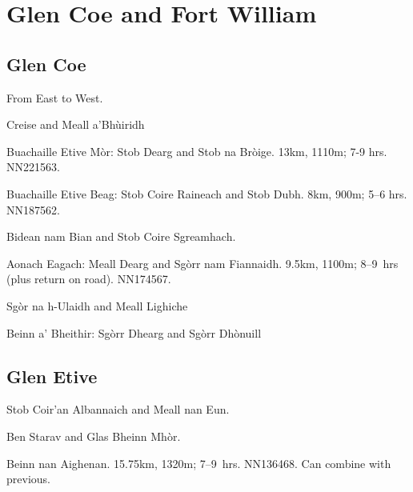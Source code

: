 
\section{Glen Coe and Fort William}

\subsection{Glen Coe}

From East to West. 

\begin{munros}
\item
Creise and Meall a'Bhùiridh

\item
Buachaille Etive Mòr: Stob Dearg and Stob na Bròige.  13km, 1110m; 7-9
hrs.  NN221563. \tick

\item
Buachaille Etive Beag: Stob Coire Raineach and Stob Dubh.  8km, 900m; 5--6
hrs.  NN187562.  \tick

\item
Bidean nam Bian and Stob Coire Sgreamhach.  \tick

\item\target
Aonach Eagach: Meall Dearg and Sgòrr nam Fiannaidh.  9.5km, 1100m; 8--9~hrs
(plus return on road).  NN174567.  \tick

\item
Sgòr na h-Ulaidh and Meall Lighiche

\item
Beinn a' Bheithir: Sgòrr Dhearg and Sgòrr Dhònuill
\end{munros}


\subsection{Glen Etive}

\begin{munros}
\item\target
Stob Coir'an Albannaich and Meall nan Eun.  \tick

\item\target
Ben Starav and Glas Bheinn Mhòr. \tick

\item\target Beinn nan Aighenan.  15.75km, 1320m; 7--9~hrs. NN136468.  Can
  combine with previous. \tick
\end{munros}

